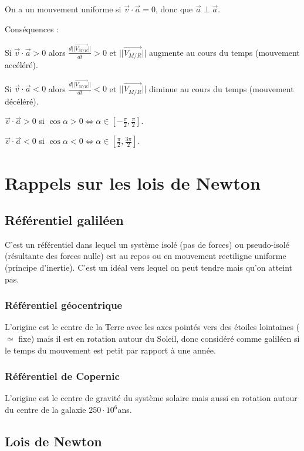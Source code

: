 \documentclass[french]{yLectureNote}
\renewcommand{\vec}{\overrightarrow}
\newcommand{\norm}[1]{||\vec{#1}||}
\begin{document}

On a un mouvement uniforme si $\vec{v}\cdot \vec{a} = 0$, donc que $\vec{a}\perp\vec{a}$.

Conséquences :

Si $\vec{v}\cdot\vec{a} > 0$ alors $\frac{d\norm{V_{M/R}}}{dt} > 0$ et $\norm{V_{M/R}}$ augmente au cours du temps (mouvement accéléré).

Si $\vec{v}\cdot\vec{a} < 0$ alors $\frac{d\norm{V_{M/R}}}{dt} < 0$ et $\norm{V_{M/R}}$ diminue au cours du temps (mouvement décéléré).

$\vec{v}\cdot\vec{a} > 0$ si $\cos \alpha > 0 \iff \alpha \in [-\frac{\pi}{2},\frac{\pi}{2}]$.

$\vec{v}\cdot\vec{a} < 0$ si $\cos \alpha < 0 \iff \alpha \in [\frac{\pi}{2},\frac{3\pi}{2}]$.
\section{Rappels sur les lois de Newton}
\subsection{Référentiel galiléen}
C'est un référentiel dans lequel un système isolé (pas de forces) ou pseudo-isolé (résultante des forces nulle) est au repos ou en mouvement rectiligne uniforme (principe d'inertie). C'est un idéal vers lequel on peut tendre mais qu'on atteint pas.

\subsubsection{Référentiel géocentrique}
L'origine est le centre de la Terre avec les axes pointés vers des étoiles lointaines ($\simeq$ fixe) mais il est en rotation autour du Soleil, donc considéré comme galiléen si le temps du mouvement est petit par rapport à une année.
\subsubsection{Référentiel de Copernic}
L'origine est le centre de gravité du système solaire mais aussi en rotation autour du centre de la galaxie $250\cdot10^6$ans.
\subsection{Lois de Newton}
\end{document}
